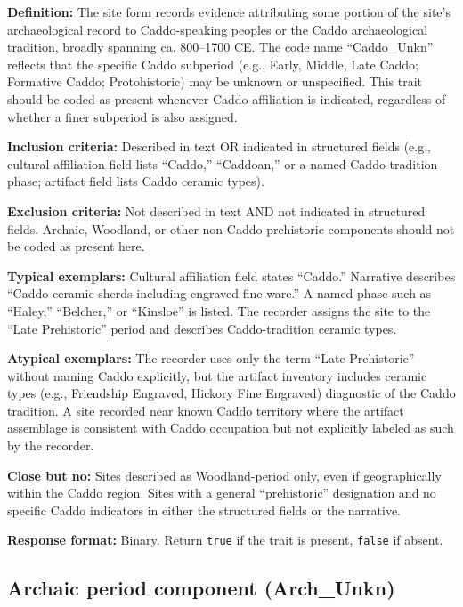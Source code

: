 \documentclass[
]{article}
\begin{document}
\textbf{Definition:} The site form records evidence attributing some
portion of the site's archaeological record to Caddo-speaking peoples or
the Caddo archaeological tradition, broadly spanning ca. 800--1700 CE.
The code name ``Caddo\_Unkn'' reflects that the specific Caddo subperiod
(e.g., Early, Middle, Late Caddo; Formative Caddo; Protohistoric) may be
unknown or unspecified. This trait should be coded as present whenever
Caddo affiliation is indicated, regardless of whether a finer subperiod
is also assigned.

\textbf{Inclusion criteria:} Described in text OR indicated in
structured fields (e.g., cultural affiliation field lists ``Caddo,''
``Caddoan,'' or a named Caddo-tradition phase; artifact field lists
Caddo ceramic types).

\textbf{Exclusion criteria:} Not described in text AND not indicated in
structured fields. Archaic, Woodland, or other non-Caddo prehistoric
components should not be coded as present here.

\textbf{Typical exemplars:} Cultural affiliation field states ``Caddo.''
Narrative describes ``Caddo ceramic sherds including engraved fine
ware.'' A named phase such as ``Haley,'' ``Belcher,'' or ``Kinsloe'' is
listed. The recorder assigns the site to the ``Late Prehistoric'' period
and describes Caddo-tradition ceramic types.

\textbf{Atypical exemplars:} The recorder uses only the term ``Late
Prehistoric'' without naming Caddo explicitly, but the artifact
inventory includes ceramic types (e.g., Friendship Engraved, Hickory
Fine Engraved) diagnostic of the Caddo tradition. A site recorded near
known Caddo territory where the artifact assemblage is consistent with
Caddo occupation but not explicitly labeled as such by the recorder.

\textbf{Close but no:} Sites described as Woodland-period only, even if
geographically within the Caddo region. Sites with a general
``prehistoric'' designation and no specific Caddo indicators in either
the structured fields or the narrative.

\textbf{Response format:} Binary. Return \texttt{true} if the trait is
present, \texttt{false} if absent.

\subsection{Archaic period component
(Arch\_Unkn)}\label{archaic-period-component-arch_unkn}
\end{document}
